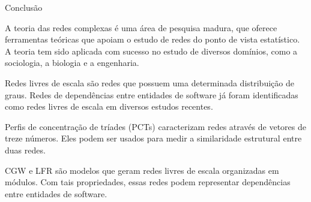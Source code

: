 \begin{section}{Conclusão} %
	
	A teoria das redes complexas é uma área de pesquisa madura, que oferece ferramentas teóricas que apoiam o estudo de redes do ponto de vista estatístico. A teoria tem sido aplicada com sucesso no estudo de diversos domínios, como a sociologia, a biologia e a engenharia.
	
	Redes livres de escala são redes que possuem uma determinada distribuição de graus. Redes de dependências entre entidades de software já foram identificadas como redes livres de escala em diversos estudos recentes.
	
	Perfis de concentração de tríades (PCTs) caracterizam redes através de vetores de treze números. Eles podem ser usados para medir a similaridade estrutural entre duas redes.
	
	CGW e LFR são modelos que geram redes livres de escala organizadas em módulos. Com tais propriedades, essas redes podem representar dependências entre entidades de software.
	
\end{section}

% 
% 
% 
% 
% 	
% 	
